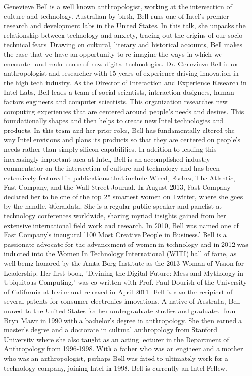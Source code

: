 {
Genevieve Bell is a well known anthropologist, working at the intersection of culture and technology. Australian by birth, Bell runs one of Intel's premier research and development labs in the United States. In this talk, she unpacks the relationship between technology and anxiety, tracing out the origins of our socio-technical fears. Drawing on cultural, literary and historical accounts, Bell makes the case that we have an opportunity to re-imagine the ways in which we encounter and make sense of new digital technologies.
}{
Dr. Genevieve Bell is an anthropologist and researcher with 15 years of experience driving innovation in the high tech industry. As the Director of Interaction and Experience Research in Intel Labs, Bell leads a team of social scientists, interaction designers, human factors engineers and computer scientists. This organization researches new computing experiences that are centered around people's needs and desires. This foundationally shapes and then helps to create new Intel technologies and products. In this team and her prior roles, Bell has fundamentally altered the way Intel envisions and plans its products so that they are centered on people's needs rather than simply silicon capabilities. In addition to leading this increasingly important area at Intel, Bell is an accomplished industry commentator on the intersection of culture and technology and has been extensively featured in publications that include Wired, Forbes, The Atlantic, Fast Company, and the Wall Street Journal. In August 2013, Fast Company declared her to be one of the top 25 smartest women on Twitter, where she goes by the handle, @feraldata. She is a regular public speaker and panelist at technology conferences worldwide, sharing myriad insights gained from her extensive international field work and research. In 2010, Bell was named one of Fast Company's inaugural '100 Most Creative People in Business.' Bell is a passionate advocate for the advancement of women in technology and in 2012 was inducted into the Women In Technology International (WITI) hall of fame, as well being honored by the Anita Borg Institute as the 2013 Woman of Vision for Leadership. Her first book, 'Divining the Digital Future: Mess and Mythology in Ubiquitous Computing,' was co-written with Prof. Paul Dourish of the University of California at Irvine and released in April 2011. Bell is also the recipient of several patents for consumer electronics innovations. A native of Australia, Bell moved to the United States for her undergraduate studies and graduated from Bryn Mawr in 1990 with a bachelor's degree in anthropology. She then earned a master's degree and a doctorate in cultural anthropology from Stanford University where she also taught as an acting lecturer in the Department of Anthropology from 1996-1998. With a father who was an engineer and a mother who was an anthropologist, perhaps Bell was fated to ultimately work for a technology company, joining Intel in 1998. Bell is currently an Intel Fellow.
}



